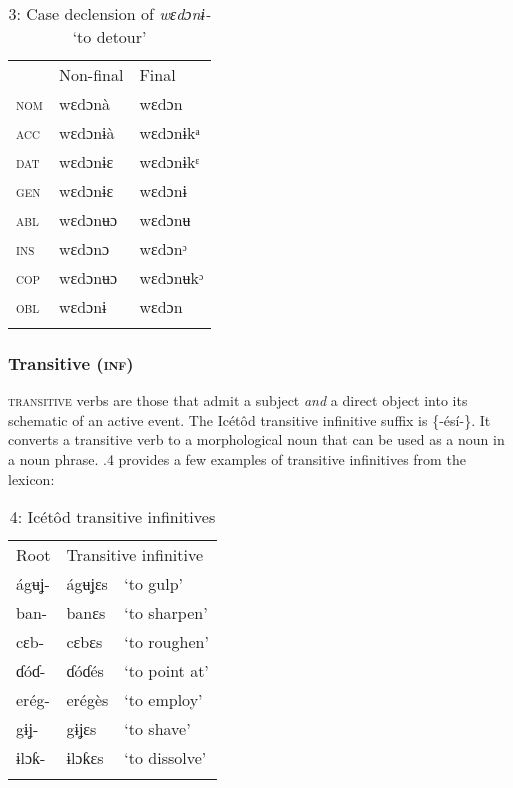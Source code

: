 \begin{table}
\caption{3: Case declension of \textit{wɛdɔnɨ-} ‘to detour’}
\label{tab:8}


\begin{tabularx}{\textwidth}{XXX} & Non-final & Final\\
\lsptoprule
\textsc{nom} & wɛdɔnà & wɛdɔn\\
\textsc{acc} & wɛdɔnɨà & wɛdɔnɨkᵃ\\
\textsc{dat} & wɛdɔnɨɛ & wɛdɔnɨkᵋ\\
\textsc{gen} & wɛdɔnɨɛ & wɛdɔnɨ\\
\textsc{abl} & wɛdɔnʉɔ & wɛdɔnʉ\\
\textsc{ins} & wɛdɔnɔ & wɛdɔnᵓ\\
\textsc{cop} & wɛdɔnʉɔ & wɛdɔnʉkᵓ\\
\textsc{obl} & wɛdɔnɨ & wɛdɔn\\
\lspbottomrule
\end{tabularx}
\end{table}

\subsubsection{Transitive (\textsc{inf})}

\textsc{transitive} verbs are those that admit a subject \textit{and} a direct object into its schematic of an active event. The Icétôd transitive infinitive suffix is \{-ésí-\}. It converts a transitive verb to a morphological noun that can be used as a noun in a noun phrase. .4 provides a few examples of transitive infinitives from the lexicon:


\begin{table}
\caption{4: Icétôd transitive infinitives}
\label{tab:8}


\begin{tabularx}{\textwidth}{XXX}
\lsptoprule

Root & \multicolumn{2}{X}{Transitive infinitive}\\
ágʉʝ- & ágʉʝɛs & ‘to gulp’\\
ban- & banɛs & ‘to sharpen’\\
cɛb- & cɛbɛs & ‘to roughen’\\
ɗóɗ- & ɗóɗés & ‘to point at’\\
erég- & erégès & ‘to employ’\\
gɨʝ- & gɨʝɛs & ‘to shave’\\
ɨlɔƙ- & ɨlɔƙɛs & ‘to dissolve’\\
\lspbottomrule
\end{tabularx}
\end{table}


